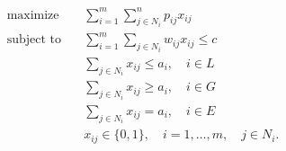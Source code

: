 \begin{align*}
\text{maximize} \quad & \sum_{i=1}^m \sum_{j \in N_i}^n p_{ij} x_{ij} \\
\text{subject to} \quad & \sum_{i=1}^m \sum_{j \in N_i} w_{ij} x_{ij} \leq c \\
& \sum_{j \in N_i} x_{ij} \leq  a_i, \quad i \in L \\
& \sum_{j \in N_i} x_{ij} \geq  a_i, \quad i \in G \\
& \sum_{j \in N_i} x_{ij} =  a_i, \quad i \in E \\
& x_{ij} \in \lbrace 0, 1 \rbrace, \quad i = 1, \ldots, m, \quad j \in N_i.
\end{align*}


